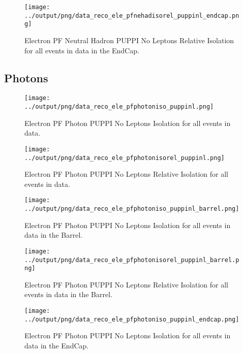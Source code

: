 \documentclass[11pt]{book}
\begin{document}
\begin{figure}[htb]
\centering
\texttt{[image: ../output/png/data\_reco\_ele\_pfnehadisorel\_puppinl\_endcap.png]}
\caption{Electron PF Neutral Hadron PUPPI No Leptons Relative Isolation for all events in data in the EndCap.}
\label{fig:data_ele_pfnehadisorel_puppinl_endcap}
\end{figure}
\clearpage

\subsection{Photons}
\begin{figure}[htb]
\centering
\texttt{[image: ../output/png/data\_reco\_ele\_pfphotoniso\_puppinl.png]}
\caption{Electron PF Photon PUPPI No Leptons Isolation for all events in data.}
\label{fig:data_ele_pfphotoniso_puppinl}
\end{figure}

\begin{figure}[htb]
\centering
\texttt{[image: ../output/png/data\_reco\_ele\_pfphotonisorel\_puppinl.png]}
\caption{Electron PF Photon PUPPI No Leptons Relative Isolation for all events in data.}
\label{fig:data_ele_pfphotonisorel_puppinl}
\end{figure}

\begin{figure}[htb]
\centering
\texttt{[image: ../output/png/data\_reco\_ele\_pfphotoniso\_puppinl\_barrel.png]}
\caption{Electron PF Photon PUPPI No Leptons Isolation for all events in data in the Barrel.}
\label{fig:data_ele_pfphotoniso_puppinl_barrel}
\end{figure}

\begin{figure}[htb]
\centering
\texttt{[image: ../output/png/data\_reco\_ele\_pfphotonisorel\_puppinl\_barrel.png]}
\caption{Electron PF Photon PUPPI No Leptons Relative Isolation for all events in data in the Barrel.}
\label{fig:data_ele_pfphotonisorel_puppinl_barrel}
\end{figure}

\begin{figure}[htb]
\centering
\texttt{[image: ../output/png/data\_reco\_ele\_pfphotoniso\_puppinl\_endcap.png]}
\caption{Electron PF Photon PUPPI No Leptons Isolation for all events in data in the EndCap.}
\label{fig:data_ele_pfphotoniso_puppinl_endcap}
\end{figure}
\end{document}
